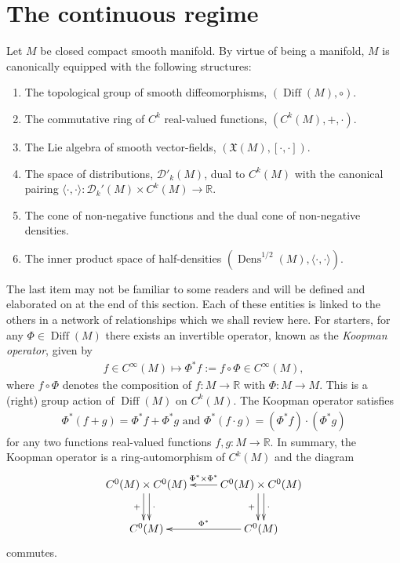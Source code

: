 \documentclass[12pt]{amsart}
\newcommand{\R}{\ensuremath{\mathbb{R}}}
\DeclareMathOperator{\Diff}{Diff}
\DeclareMathOperator{\Dens}{Dens}
\begin{document}
\section{The continuous regime}
\label{sec:continous}
Let $M$ be closed compact smooth manifold.
By virtue of being a manifold, $M$ is canonically equipped with the following structures:
\begin{enumerate}
	\item The topological group of smooth diffeomorphisms, $(\Diff(M), \circ)$.
	\item The commutative ring of $C^k$ real-valued functions, $(C^k(M), + , \cdot)$.
	\item The Lie algebra of smooth vector-fields, $(\mathfrak{X}(M) , [ \cdot , \cdot ])$.
	\item The space of distributions, $\mathcal{D}'_k(M)$, dual to $C^k(M)$
	with the canonical pairing $\langle \cdot , \cdot \rangle : \mathcal{D}_k'(M) \times C^k(M) \to \R$.
	\item The cone of non-negative functions and the dual cone of non-negative densities.
	\item The inner product space of half-densities $(\Dens^{1/2}(M), \langle \cdot , \cdot \rangle)$.
\end{enumerate}
The last item may not be familiar to some readers and will be defined and elaborated on at the end of this section.
Each of these entities is linked to the others in a network of relationships
which we shall review here.
For starters, for any $\Phi \in \Diff(M)$ there exists an invertible operator, known as the \emph{Koopman operator}, given by
\begin{align*}
	f \in C^\infty(M) \mapsto \Phi^* f := f \circ \Phi \in C^\infty(M),
\end{align*}
where $f \circ \Phi$ denotes the composition of $f:M \to \R$ with $\Phi:M \to M$.
This is a (right) group action of $\Diff(M)$ on $C^k(M)$.
The Koopman operator satisfies
\begin{align*}
	\Phi^*(f+g) = \Phi^*f + \Phi^*g \text{ and } \Phi^*(f\cdot g) = (\Phi^*f) \cdot (\Phi^*g)
\end{align*}
for any two functions real-valued functions $f,g: M \to \mathbb{R}$.
In summary, the Koopman operator is a ring-automorphism of $C^k(M)$
and the diagram
\begin{equation}
	\xymatrix{
		C^0(M) \times C^0(M)  \ar@<-0.6ex>[d]_{+} \ar@<0.6ex>[d]^{\cdot} & \ar[l]_{\Phi^* \times \Phi^*} C^0(M) \times C^0(M)  \ar@<-0.6ex>[d]_{+} \ar@<0.6ex>[d]^{\cdot} \\
		C^0(M)  & \ar[l]_{\Phi^*} C^0(M)
	}
\end{equation}
commutes.
\end{document}
